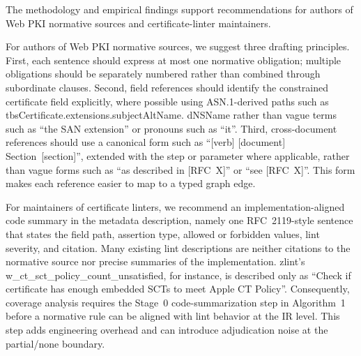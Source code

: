 The methodology and empirical findings support recommendations for authors of Web PKI
normative sources and certificate-linter maintainers.

For authors of Web PKI normative sources, we suggest three drafting principles. First,
each sentence should express at most one normative obligation; multiple
obligations should be separately numbered rather than combined through
subordinate clauses. Second, field references should identify the constrained
certificate field explicitly, where possible using ASN.1-derived paths such as
tbsCertificate.\allowbreak extensions.\allowbreak subjectAltName.\allowbreak
dNSName rather than vague terms such as ``the SAN extension'' or pronouns such
as ``it''. Third, cross-document references should use a canonical form such as
``[verb] [document] Section~[section]'', extended with the step or parameter
where applicable,
rather than vague forms such as ``as described in [RFC~X]'' or ``see
[RFC~X]''. This form makes each reference easier to map to a typed graph edge.

For maintainers of certificate linters, we recommend an
implementation-aligned code summary in the metadata description, namely one
RFC~2119-style sentence that states the field path, assertion type, allowed or
forbidden values, lint severity, and citation. Many existing lint descriptions
are neither citations to the normative source nor precise summaries of the
implementation. zlint's w\_ct\_sct\_policy\_count\_unsatisfied, for instance,
is described only as ``Check if certificate has enough embedded SCTs to meet
Apple CT Policy''. Consequently, coverage analysis requires the Stage~0
code-summarization step in Algorithm~1 before a normative rule can be aligned
with lint behavior at the IR level. This step adds engineering overhead and can
introduce adjudication noise at the partial/none boundary.
